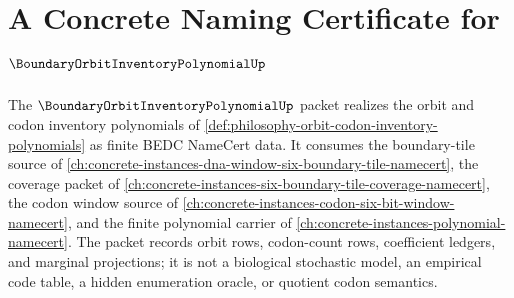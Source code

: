 \chapter{A Concrete Naming Certificate for $\BoundaryOrbitInventoryPolynomialUp$}
\label{ch:concrete-instances-boundary-orbit-inventory-polynomial-namecert}

The $\BoundaryOrbitInventoryPolynomialUp$ packet realizes the orbit and codon inventory polynomials of \autoref{def:philosophy-orbit-codon-inventory-polynomials} as finite BEDC NameCert data. It consumes the boundary-tile source of \autoref{ch:concrete-instances-dna-window-six-boundary-tile-namecert}, the coverage packet of \autoref{ch:concrete-instances-six-boundary-tile-coverage-namecert}, the codon window source of \autoref{ch:concrete-instances-codon-six-bit-window-namecert}, and the finite polynomial carrier of \autoref{ch:concrete-instances-polynomial-namecert}. The packet records orbit rows, codon-count rows, coefficient ledgers, and marginal projections; it is not a biological stochastic model, an empirical code table, a hidden enumeration oracle, or quotient codon semantics.

